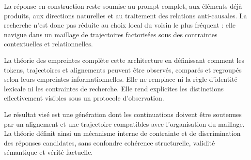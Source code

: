 \documentclass[11pt,a4paper]{report}
\theoremstyle{definition}
\theoremstyle{plain}
\theoremstyle{remark}
\begin{document}
La réponse en construction reste soumise au prompt complet,
aux éléments déjà produits, aux directions naturelles et au
traitement des relations anti-causales. La recherche n'est donc
pas réduite au choix local du voisin le plus fréquent : elle
navigue dans un maillage de trajectoires factorisées sous des
contraintes contextuelles et relationnelles.

La théorie des empreintes complète cette architecture en
définissant comment les tokens, trajectoires et alignements
peuvent être observés, comparés et regroupés selon leurs
empreintes informationnelles. Elle ne remplace ni la règle
d'identité lexicale ni les contraintes de recherche. Elle rend
explicites les distinctions effectivement visibles sous un
protocole d'observation.

Le résultat visé est une génération dont les continuations
doivent être soutenues par un alignement et une trajectoire
compatibles avec l'organisation du maillage. La théorie définit
ainsi un mécanisme interne de contrainte et de discrimination
des réponses candidates, sans confondre cohérence structurelle,
validité sémantique et vérité factuelle.
\end{document}
